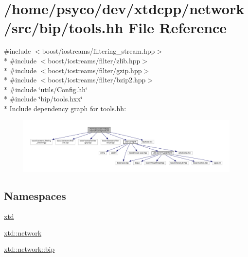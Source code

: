\hypertarget{tools_8hh}{}\section{/home/psyco/dev/xtdcpp/network/src/bip/tools.hh File Reference}
\label{tools_8hh}
{\ttfamily \#include $<$boost/iostreams/filtering\+\_\+stream.\+hpp$>$}\\*
{\ttfamily \#include $<$boost/iostreams/filter/zlib.\+hpp$>$}\\*
{\ttfamily \#include $<$boost/iostreams/filter/gzip.\+hpp$>$}\\*
{\ttfamily \#include $<$boost/iostreams/filter/bzip2.\+hpp$>$}\\*
{\ttfamily \#include \char`\"{}utils/\+Config.\+hh\char`\"{}}\\*
{\ttfamily \#include \char`\"{}bip/tools.\+hxx\char`\"{}}\\*
Include dependency graph for tools.\+hh\+:
\nopagebreak
\begin{figure}[H]
\begin{center}
\leavevmode
\includegraphics[width=350pt]{tools_8hh__incl}
\end{center}
\end{figure}
\subsection*{Namespaces}
\begin{DoxyCompactItemize}
\item 
 \hyperlink{namespacextd}{xtd}
\item 
 \hyperlink{namespacextd_1_1network}{xtd\+::network}
\item 
 \hyperlink{namespacextd_1_1network_1_1bip}{xtd\+::network\+::bip}
\end{DoxyCompactItemize}
